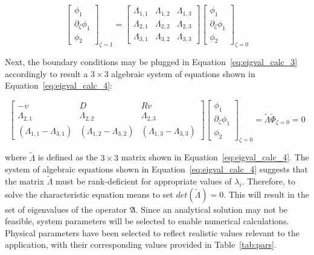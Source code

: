 \begin{equation} \label{eq:eigval_calc_3}
    \begin{bmatrix}
        \phi_1 \\ \partial_\zeta \phi_1 \\ \phi_2
    \end{bmatrix}_{\zeta=1} = \begin{bmatrix}
        \Lambda_{1,1} & \Lambda_{1,2} & \Lambda_{1,3} \\
        \Lambda_{2,1} & \Lambda_{2,2} & \Lambda_{2,3} \\
        \Lambda_{3,1} & \Lambda_{3,2} & \Lambda_{3,3}
    \end{bmatrix} \begin{bmatrix}
        \phi_1 \\ \partial_\zeta \phi_1 \\ \phi_2
    \end{bmatrix}_{\zeta=0}
\end{equation}

Next, the boundary conditions may be plugged in Equation~\ref{eq:eigval_calc_3} accordingly to result a $3 \times 3$ algebraic system of equations shown in Equation~\ref{eq:eigval_calc_4}:

\begin{equation} \label{eq:eigval_calc_4}
    \begin{bmatrix}
        -v & D & Rv \\
        \Lambda_{2,1} & \Lambda_{2,2} & \Lambda_{2,3} \\
        (\Lambda_{1,1} - \Lambda_{3,1}) & (\Lambda_{1,2} - \Lambda_{3,2}) & (\Lambda_{1,3} - \Lambda_{3,3})
    \end{bmatrix} \begin{bmatrix}
        \phi_1 \\ \partial_\zeta \phi_1 \\ \phi_2
    \end{bmatrix}_{\zeta=0} = \tilde{\Lambda} \tilde{\Phi}_{\zeta = 0} = 0
\end{equation}

where $\tilde{\Lambda}$ is defined as the $3 \times 3$ matrix shown in Equation~\ref{eq:eigval_calc_4}. The system of algebraic equations shown in Equation~\ref{eq:eigval_calc_4} suggests that the matrix $\tilde{\Lambda}$ must be rank-deficient for appropriate values of $\lambda_i$. Therefore, to solve the characteristic equation means to set $det(\tilde{\Lambda}) = 0$. This will result in the set of eigenvalues of the operator $\mathfrak{A}$. Since an analytical solution may not be feasible, system parameters will be selected to enable numerical calculations. Physical parameters have been selected to reflect realistic values relevant to the application, with their corresponding values provided in Table~\ref{tab:pars}.

